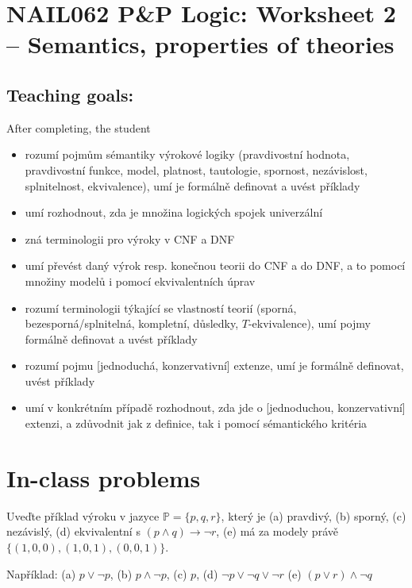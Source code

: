 \section*{NAIL062 P\&P Logic: Worksheet 2 -- Semantics, properties of theories}

\subsection*{Teaching goals:} After completing, the student

    \begin{itemize}\setlength{\itemsep}{0pt}
        \item rozumí pojmům sémantiky výrokové logiky (pravdivostní hodnota, pravdivostní funkce, model, platnost, tautologie, spornost, nezávislost, splnitelnost, ekvivalence), umí je formálně definovat a uvést příklady
        \item umí rozhodnout, zda je množina logických spojek univerzální
        \item zná terminologii pro výroky v CNF a DNF %
        \item umí převést daný výrok resp. konečnou teorii do CNF a do DNF, a to pomocí množiny modelů i pomocí ekvivalentních úprav
        \item rozumí terminologii týkající se vlastností teorií (sporná, bezesporná/splnitelná, kompletní, důsledky, $T$-ekvivalence), umí pojmy formálně definovat a uvést příklady
        \item rozumí pojmu [jednoduchá, konzervativní] extenze, umí je formálně definovat, uvést příklady
        \item umí v konkrétním případě rozhodnout, zda jde o [jednoduchou, konzervativní] extenzi, a zdůvodnit jak z definice, tak i pomocí sémantického kritéria
    \end{itemize}


\section*{In-class problems}


\begin{problem}

    Uveďte příklad výroku v jazyce $\mathbb P=\{p,q,r\}$, který je (a) pravdivý, (b) sporný, (c) nezávislý, (d) ekvivalentní s $(p\wedge q)\to\neg r$, (e) má za modely právě $\{(1,0,0),(1,0,1),(0,0,1)\}$.


    \begin{solution}
        Například: (a) $p\lor\neg p$, (b) $p\land\neg p$, (c) $p$, (d) $\neg p\lor\neg q\lor\neg r$ (e) $(p\lor r)\land\neg q$            
    \end{solution}

\end{problem}


